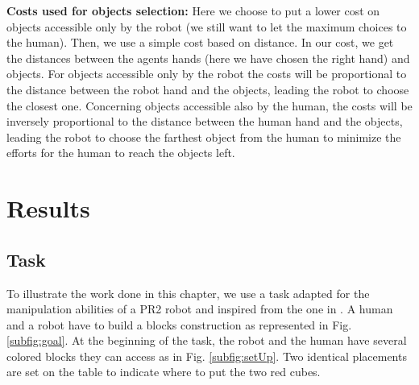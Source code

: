 \documentclass[english,a4paper,11pt,twoside]{StyleThese}
\begin{document}
\textbf{Costs used for objects selection:}
Here we choose to put a lower cost on objects accessible only by the robot (we still want to let the maximum choices to the human). Then, we use a simple cost based on distance. In our cost, we get the distances between the agents hands (here we have chosen the right hand) and objects. For objects accessible only by the robot the costs will be proportional to the distance between the robot hand and the objects, leading the robot to choose the closest one. Concerning objects accessible also by the human, the costs will be inversely proportional to the distance between the human hand and the objects, leading the robot to choose the farthest object from the human to minimize the efforts for the human to reach the objects left. 


\section{Results}

\subsection{Task}

To illustrate the work done in this chapter, we use a task adapted for the manipulation abilities of a PR2 robot and inspired from the one in \cite{clodic2014key}. A human and a robot have to build a blocks construction as represented in Fig. \ref{subfig:goal}. At the beginning of the task, the robot and the human have several colored blocks they can access as in Fig. \ref{subfig:setUp}. Two identical placements are set on the table to indicate where to put the two red cubes.
\end{document}
